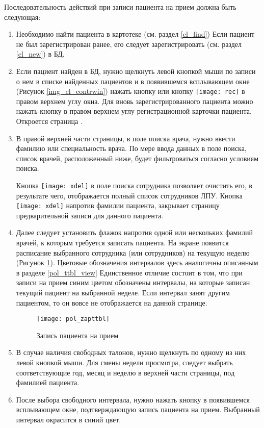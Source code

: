 Последовательность действий при записи пациента на прием должна быть следующая:
\begin{enumerate}
 \item \label{n4} Необходимо найти пациента в картотеке (см. раздел \ref{cl_find}) Если пациент не был зарегистрирован ранее, его следует зарегистрировать (см. раздел \ref{cl_new}) в  БД.
 \item Если пациент найден в БД, нужно щелкнуть левой кнопкой мыши по записи о нем в списке найденных пациентов и в появившемся всплывающем окне (Рисунок \ref{img_cl_contrwin}) нажать кнопку  или кнопку \texttt{[image: rec]} в правом верхнем углу окна. Для вновь зарегистрированного пациента можно нажать кнопку  в правом верхнем углу регистрационной карточки пациента. Откроется страница .  
 \item В правой верхней части страницы, в поле поиска врача, нужно ввести фамилию или специальность врача. По мере ввода данных в поле поиска, список врачей, расположенный ниже, будет фильтроваться согласно условиям поиска.
 
 \begin{prim}
   Кнопка  \texttt{[image: xdel]} в поле поиска сотрудника позволяет очистить его, в результате чего, отображается полный список сотрудников ЛПУ. Кнопка  \texttt{[image: xdel]} напротив фамилии пациента, закрывает страницу предварительной записи для данного пациента.
  \end{prim}
  
 \item \label{n5} Далее следует установить флажок напротив одной или нескольких фамилий врачей, к которым требуется записать пациента. На экране появится расписание выбранного сотрудника (или сотрудников) на текущую неделю (Рисунок \ref{img_pol_zapttbl}). Цветовые обозначения интервалов здесь аналогичны описанным в разделе \ref{pol_ttbl_view} Единственное отличие состоит в том, что при записи на прием  синим цветом обозначены интервалы, на которые записан текущий пациент на выбранной неделе. Если интервал занят другим пациентом, то он вовсе не отображается на данной странице.
 
 \begin{figure}[ht]\centering
  \texttt{[image: pol\_zapttbl]}
  \caption{Запись пациента на прием}
  \label{img_pol_zapttbl}
 \end{figure}
 
 \item В случае наличия свободных талонов, нужно щелкнуть по одному из них левой кнопкой мыши. Для смены недели просмотра, следует выбрать соответствующие год, месяц и неделю в верхней части страницы, под фамилией пациента.
 \item После выбора свободного интервала, нужно нажать кнопку  в появившемся всплывающем окне, подтверждающую запись пациента на прием. Выбранный интервал окрасится в синий цвет.
\end{enumerate}

